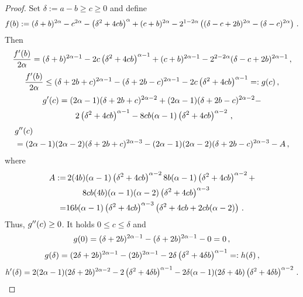 \begin{proof}	
	Set $\delta := a-b \geq c \geq 0$ and define
	\begin{equation*}
		f(b) := (\delta+b)^{2\alpha}-c^{2\alpha}-\left( \delta^2+4cb \right)^{\alpha}+(c+b)^{2\alpha} -2^{1-2\alpha} \left( 	(\delta-c + 2b)^{2\alpha}  -  (\delta-c)^{2\alpha} \right)
		\, .
	\end{equation*}
	Then
	\begin{equation*}
		\frac{f^\prime(b)}{2\alpha} =
		(\delta+b)^{2\alpha-1}-2c\left( \delta^2+4cb \right)^{\alpha-1}+(c+b)^{2\alpha-1} -2^{2-2\alpha} (\delta-c + 2b)^{2\alpha-1}
		\, ,
	\end{equation*}
	\begin{align*}
		\frac{f^\prime(b)}{2\alpha} 
		\leq 
		(\delta+2b+c)^{2\alpha-1}- (\delta+2b-c)^{2\alpha-1} - 2c\left( \delta^2+4cb \right)^{\alpha-1} =: g(c)
		\, ,
	\end{align*}
	\begin{align*}
		g^\prime(c) 
		&= (2\alpha-1)(\delta+2b+c)^{2\alpha-2}+ (2\alpha-1)(\delta+2b-c)^{2\alpha-2} - 
		\\&\qquad 2\left( \delta^2+4cb \right)^{\alpha-1} -8cb(\alpha-1)\left( \delta^2+4cb \right)^{\alpha-2}
		\, ,
	\end{align*}
	\begin{align*}
		&g^{\prime\prime}(c)\\ &= (2\alpha-1)(2\alpha-2)(\delta+2b+c)^{2\alpha-3}- 
		(2\alpha-1)(2\alpha-2)(\delta+2b-c)^{2\alpha-3}  - A\, ,
	\end{align*}
	where
	\begin{align*}
		A := &\,2(4b)(\alpha-1)\left( \delta^2+4cb \right)^{\alpha-2} 
		8b(\alpha-1)\left( \delta^2+4cb \right)^{\alpha-2}
		+\\&\qquad
		8cb(4b)(\alpha-1)(\alpha-2)\left( \delta^2+4cb \right)^{\alpha-3}
		\\=&
		16b(\alpha-1)\left( \delta^2+4cb \right)^{\alpha-3} 
		\left( \delta^2+4cb + 2cb(\alpha-2) \right)
		\, .
	\end{align*}
	Thus, 	$g^{\prime\prime}(c) \geq 0$.
	It holds $0 \leq c \leq \delta$ and
	\begin{equation*}
		g(0) =
		(\delta+2b)^{2\alpha-1}- (\delta+2b)^{2\alpha-1}-0=0
		\, ,
	\end{equation*}
	\begin{equation*}
		g(\delta) = (2\delta+2b)^{2\alpha-1}- (2b)^{2\alpha-1} - 2\delta\left( \delta^2+4\delta b \right)^{\alpha-1} =: h(\delta)\, ,
	\end{equation*}
	\begin{equation*}
		h\pr(\delta) = 2(2\alpha-1)(2\delta+2b)^{2\alpha-2}-2\br{\delta^2+4\delta b}^{\alpha-1}-2\delta(\alpha-1)(2\delta+4b)\br{\delta^2+4\delta b}^{\alpha-2}\eqfs

\end{equation*}
\end{proof}
